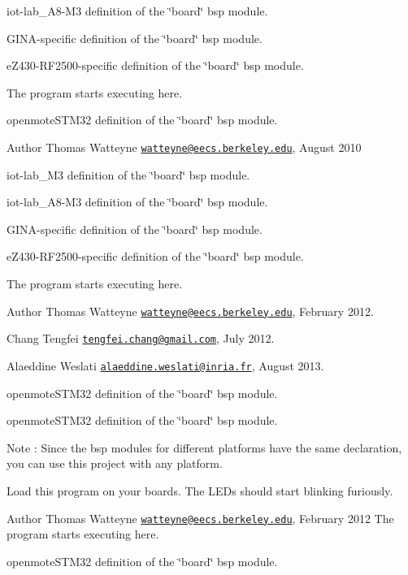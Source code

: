 iot-\/lab\+\_\+\+A8-\/\+M3 definition of the \char`\"{}board\char`\"{} bsp module.

G\+I\+N\+A-\/specific definition of the \char`\"{}board\char`\"{} bsp module.

e\+Z430-\/\+R\+F2500-\/specific definition of the \char`\"{}board\char`\"{} bsp module.

The program starts executing here.

openmote\+S\+T\+M32 definition of the \char`\"{}board\char`\"{} bsp module.

\begin{DoxyAuthor}{Author}
Thomas Watteyne \href{mailto:watteyne@eecs.berkeley.edu}{\tt watteyne@eecs.\+berkeley.\+edu}, August 2010
\end{DoxyAuthor}
iot-\/lab\+\_\+\+M3 definition of the \char`\"{}board\char`\"{} bsp module.

iot-\/lab\+\_\+\+A8-\/\+M3 definition of the \char`\"{}board\char`\"{} bsp module.

G\+I\+N\+A-\/specific definition of the \char`\"{}board\char`\"{} bsp module.

e\+Z430-\/\+R\+F2500-\/specific definition of the \char`\"{}board\char`\"{} bsp module.

The program starts executing here.

\begin{DoxyAuthor}{Author}
Thomas Watteyne \href{mailto:watteyne@eecs.berkeley.edu}{\tt watteyne@eecs.\+berkeley.\+edu}, February 2012. 

Chang Tengfei \href{mailto:tengfei.chang@gmail.com}{\tt tengfei.\+chang@gmail.\+com}, July 2012. 

Alaeddine Weslati \href{mailto:alaeddine.weslati@inria.fr}{\tt alaeddine.\+weslati@inria.\+fr}, August 2013.
\end{DoxyAuthor}
openmote\+S\+T\+M32 definition of the \char`\"{}board\char`\"{} bsp module.

openmote\+S\+T\+M32 definition of the \char`\"{}board\char`\"{} bsp module.

\begin{DoxyNote}{Note}
\+: Since the bsp modules for different platforms have the same declaration, you can use this project with any platform.
\end{DoxyNote}
Load this program on your boards. The L\+E\+Ds should start blinking furiously.

\begin{DoxyAuthor}{Author}
Thomas Watteyne \href{mailto:watteyne@eecs.berkeley.edu}{\tt watteyne@eecs.\+berkeley.\+edu}, February 2012 The program starts executing here.
\end{DoxyAuthor}
openmote\+S\+T\+M32 definition of the \char`\"{}board\char`\"{} bsp module.

